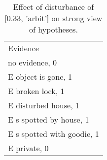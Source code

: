 \begin{table}\begin{tabular}{l}\toprule\multirow{2}{*}{Evidence} \\\\\midrule
no evidence, 0 & \\E object is gone, 1 & \\E broken lock, 1 & \\E disturbed house, 1 & \\E s spotted by house, 1 & \\E s spotted with goodie, 1 & \\E private, 0 & \\\bottomrule\end{tabular}\caption{Effect of disturbance of [0.33, 'arbit'] on strong view of hypotheses.}\end{table}